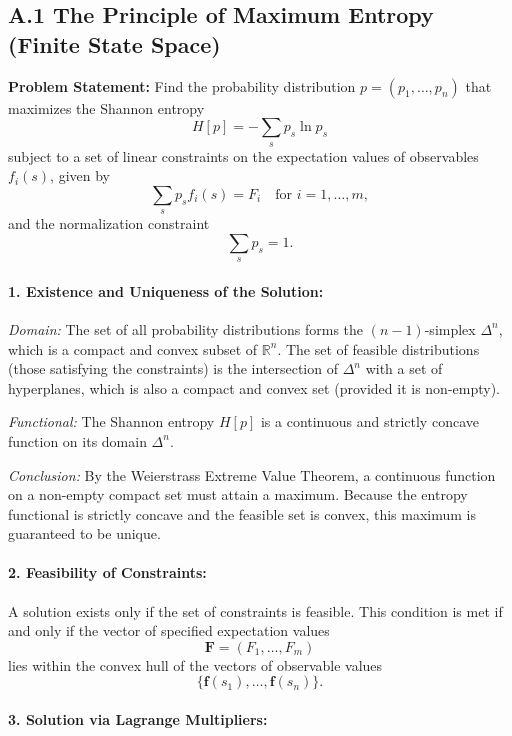 \documentclass[12pt, a4paper]{article}
\begin{document}
\subsection*{A.1 The Principle of Maximum Entropy (Finite State Space)}

\textbf{Problem Statement:} Find the probability distribution \( p = (p_1, \dots, p_n) \) that maximizes the Shannon entropy
\[
H[p] = - \sum_s p_s \ln p_s
\]
subject to a set of linear constraints on the expectation values of observables \( f_i(s) \), given by
\[
\sum_s p_s f_i(s) = F_i \quad \text{for } i=1,\dots,m,
\]
and the normalization constraint
\[
\sum_s p_s = 1.
\]

\paragraph{1. Existence and Uniqueness of the Solution:}

\emph{Domain:} The set of all probability distributions forms the \((n-1)\)-simplex \(\Delta^n\), which is a compact and convex subset of \(\mathbb{R}^n\). The set of feasible distributions (those satisfying the constraints) is the intersection of \(\Delta^n\) with a set of hyperplanes, which is also a compact and convex set (provided it is non-empty).

\emph{Functional:} The Shannon entropy \(H[p]\) is a continuous and strictly concave function on its domain \(\Delta^n\).

\emph{Conclusion:} By the Weierstrass Extreme Value Theorem, a continuous function on a non-empty compact set must attain a maximum. Because the entropy functional is strictly concave and the feasible set is convex, this maximum is guaranteed to be unique.

\paragraph{2. Feasibility of Constraints:}

A solution exists only if the set of constraints is feasible. This condition is met if and only if the vector of specified expectation values
\[
\mathbf{F} = (F_1, \dots, F_m)
\]
lies within the convex hull of the vectors of observable values
\[
\{ \mathbf{f}(s_1), \dots, \mathbf{f}(s_n) \}.
\]

\paragraph{3. Solution via Lagrange Multipliers:}
\end{document}
